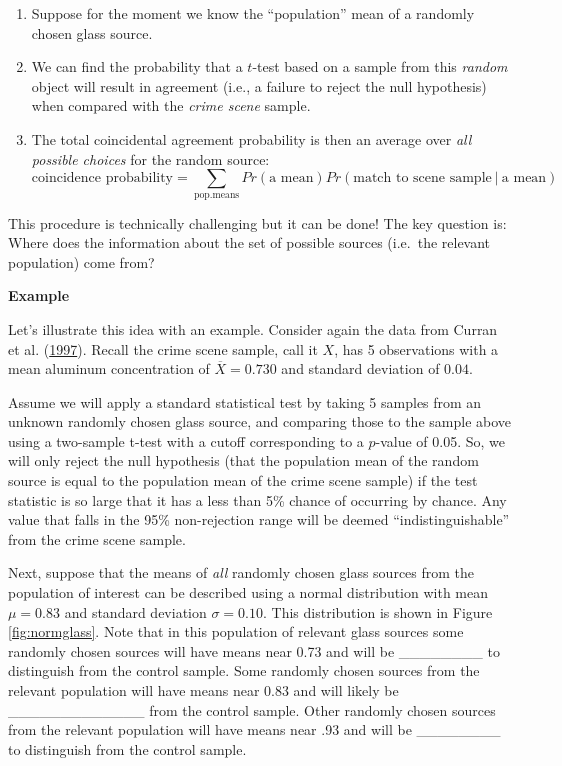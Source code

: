 \documentclass[]{book}
\providecommand{\tightlist}{%
  \setlength{\itemsep}{0pt}\setlength{\parskip}{0pt}}
\theoremstyle{definition}
\theoremstyle{definition}
\theoremstyle{remark}
\begin{document}
\begin{enumerate}
\def\labelenumi{\arabic{enumi}.}
\tightlist
\item
  Suppose for the moment we know the ``population'' mean of a randomly
  chosen glass source.
\item
  We can find the probability that a \(t\)-test based on a sample from
  this \emph{random} object will result in agreement (i.e., a failure to
  reject the null hypothesis) when compared with the \emph{crime scene}
  sample.
\item
  The total coincidental agreement probability is then an average over
  \emph{all possible choices} for the random source:
  \[ \text{coincidence probability} = \sum\limits_{\text{pop.means}} Pr(\text{a mean}) Pr(\text{match to scene sample}\ |\ \text{a mean})\]
\end{enumerate}

This procedure is technically challenging but it can be done! The key
question is: Where does the information about the set of possible
sources (i.e.~the relevant population) come from?

\textbf{Example}

Let's illustrate this idea with an example. Consider again the data from
Curran et al. (\protect\hyperlink{ref-curranetal}{1997}). Recall the
crime scene sample, call it \(X\), has 5 observations with a mean
aluminum concentration of \(\overline{X} = 0.730\) and standard
deviation of \(0.04\).

Assume we will apply a standard statistical test by taking 5 samples
from an unknown randomly chosen glass source, and comparing those to the
sample above using a two-sample t-test with a cutoff corresponding to a
\(p\)-value of 0.05. So, we will only reject the null hypothesis (that
the population mean of the random source is equal to the population mean
of the crime scene sample) if the test statistic is so large that it has
a less than 5\% chance of occurring by chance. Any value that falls in
the 95\% non-rejection range will be deemed ``indistinguishable'' from
the crime scene sample.

Next, suppose that the means of \emph{all} randomly chosen glass sources
from the population of interest can be described using a normal
distribution with mean \(\mu = 0.83\) and standard deviation
\(\sigma = 0.10\). This distribution is shown in Figure
\ref{fig:normglass}. Note that in this population of relevant glass
sources some randomly chosen sources will have means near 0.73 and will
be \_\_\_\_\_\_\_\_ to distinguish from the control sample. Some
randomly chosen sources from the relevant population will have means
near 0.83 and will likely be \_\_\_\_\_\_\_\_\_\_\_\_\_ from the control
sample. Other randomly chosen sources from the relevant population will
have means near .93 and will be \_\_\_\_\_\_\_\_ to distinguish from the
control sample.
\end{document}
